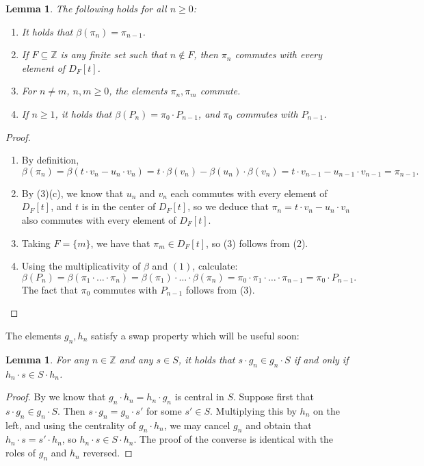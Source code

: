 \documentclass{amsart}
\newtheorem{lem}[equation]{Lemma}
\theoremstyle{definition}
\numberwithin{equation}{section}
\begin{document}
\begin{lem}\label{lem:elempin}
The following holds for all $n \ge 0$:
\begin{enumerate}
\item It holds that $\beta(\pi_n) = \pi_{n-1}$.
\item If $F \subseteq \mathbb{Z}$ is any finite set such that $n\notin F$, then $\pi_n$ commutes with every element of $D_F[t]$.
\item For $n \ne m$, $n,m \ge 0$, the elements $\pi_n, \pi_m$ commute.
\item If $n\ge 1$, it holds that $\beta(P_n) = \pi_0 \cdot P_{n-1}$, and $\pi_0$ commutes with $P_{n-1}$.
\end{enumerate}
\end{lem}
\begin{proof}\quad
\begin{enumerate}
\item By definition,
\[
\beta(\pi_n) = \beta(t\cdot v_n - u_n\cdot v_n) = 
t\cdot \beta(v_n) - \beta(u_n)\cdot\beta(v_n) = 
t\cdot v_{n-1} - u_{n-1}\cdot v_{n-1} = \pi_{n-1}.
\]
\item By (3)(c),
we know that $u_n$ and $v_n$ each commutes with every element of $D_F[t]$, and $t$ is in the center of $D_F[t]$,
so we deduce that $\pi_n = t\cdot v_n - u_n\cdot v_n$ also commutes with every element of $D_F[t]$.
\item Taking $F = \{m\}$, we have that $\pi_m \in D_F[t]$,
so (3) follows from (2).
\item Using the multiplicativity of $\beta$ and $(1)$, calculate:
\[
\beta(P_n) = \beta(\pi_1\cdot \dots \cdot \pi_n) = 
\beta(\pi_1) \cdot \dots \cdot \beta(\pi_n) = 
\pi_0 \cdot \pi_1 \cdot \dots \cdot \pi_{n-1} = \pi_0 \cdot P_{n-1}.
\]
The fact that $\pi_0$ commutes with $P_{n-1}$ follows from (3).
\end{enumerate}
\end{proof}

The elements $g_n, h_n$ satisfy a swap property which will be useful soon:
\begin{lem}\label{lem:swap}
For any $n \in \mathbb{Z}$ and any $s \in S$,
it holds that $s\cdot g_n \in g_n\cdot S$ if and only if $h_n \cdot s \in S \cdot h_n$.
\end{lem}
\begin{proof}
By  we know that $g_n \cdot h_n = h_n \cdot g_n$ is central in $S$.
Suppose first that $s\cdot g_n \in g_n\cdot S$.
Then $s\cdot g_n = g_n \cdot s'$ for some $s' \in S$.
Multiplying this by $h_n$ on the left, and using the centrality of $g_n\cdot h_n$,
we may cancel $g_n$ and obtain that $h_n \cdot s = s' \cdot h_n$,
so $h_n \cdot s \in S\cdot h_n$.
The proof of the converse is identical with the roles of $g_n$ and $h_n$ reversed.
\end{proof}
\end{document}
